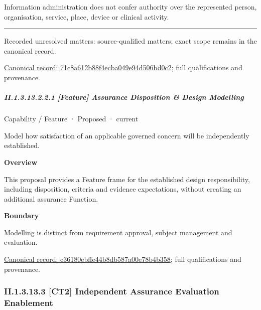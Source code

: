Information administration does not confer authority over the represented person, organisation, service, place, device or clinical activity.



\medskip\hrule\medskip

{\small Recorded unresolved matters: source-qualified matters; exact scope remains in the canonical record.}\par
{\footnotesize \href{../../../../continuum/strategy/capability/71c8a612b88f4ecba049e94d506bd0c2.md}{Canonical record: 71c8a612b88f4ecba049e94d506bd0c2}; full qualifications and provenance.}\par
\subparagraph*{II.1.3.13.2.2.1 [Feature] Assurance Disposition \& Design Modelling}
\label{navigation:II.1.3.13.2.2.1}

\label{element:c36180ebffe44b8db587a00e78b4b358}
{\small Capability / Feature · Proposed · current}\par

Model how satisfaction of an applicable governed concern will be independently established.



\textbf{Overview}



This proposal provides a Feature frame for the established design responsibility, including disposition, criteria and evidence expectations, without creating an additional assurance Function.



\textbf{Boundary}



Modelling is distinct from requirement approval, subject management and evaluation.


{\footnotesize \href{../../../../continuum/strategy/capability/feature/c36180ebffe44b8db587a00e78b4b358.md}{Canonical record: c36180ebffe44b8db587a00e78b4b358}; full qualifications and provenance.}\par
\subsubsection*{II.1.3.13.3 [CT2] Independent Assurance Evaluation Enablement}
\label{navigation:II.1.3.13.3}

